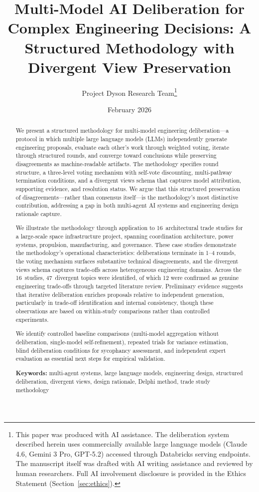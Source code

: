 \documentclass[11pt,a4paper]{article}
\title{\textbf{Multi-Model AI Deliberation for Complex Engineering Decisions: A Structured Methodology with Divergent View Preservation}}
\author{Project Dyson Research Team\thanks{This paper was produced with AI assistance. The deliberation system described herein uses commercially available large language models (Claude 4.6, Gemini 3 Pro, GPT-5.2) accessed through Databricks serving endpoints. The manuscript itself was drafted with AI writing assistance and reviewed by human researchers. Full AI involvement disclosure is provided in the Ethics Statement (Section~\ref{sec:ethics}).}}
\affil{Project Dyson --- Open-Source Space Infrastructure Initiative\\ \texttt{https://projectdyson.org}}
\date{February 2026}
\begin{document}
\maketitle

\begin{abstract}
We present a structured methodology for multi-model engineering deliberation---a protocol in which multiple large language models (LLMs) independently generate engineering proposals, evaluate each other's work through weighted voting, iterate through structured rounds, and converge toward conclusions while preserving disagreements as machine-readable artifacts. The methodology specifies round structure, a three-level voting mechanism with self-vote discounting, multi-pathway termination conditions, and a divergent views schema that captures model attribution, supporting evidence, and resolution status. We argue that this structured preservation of disagreements---rather than consensus itself---is the methodology's most distinctive contribution, addressing a gap in both multi-agent AI systems and engineering design rationale capture.

We illustrate the methodology through application to 16~architectural trade studies for a large-scale space infrastructure project, spanning coordination architecture, power systems, propulsion, manufacturing, and governance. These case studies demonstrate the methodology's operational characteristics: deliberations terminate in 1--4 rounds, the voting mechanism surfaces substantive technical disagreements, and the divergent views schema captures trade-offs across heterogeneous engineering domains. Across the 16~studies, 47~divergent topics were identified, of which 12 were confirmed as genuine engineering trade-offs through targeted literature review. Preliminary evidence suggests that iterative deliberation enriches proposals relative to independent generation, particularly in trade-off identification and internal consistency, though these observations are based on within-study comparisons rather than controlled experiments.

We identify controlled baseline comparisons (multi-model aggregation without deliberation, single-model self-refinement), repeated trials for variance estimation, blind deliberation conditions for sycophancy assessment, and independent expert evaluation as essential next steps for empirical validation.

\medskip
\noindent\textbf{Keywords:} multi-agent systems, large language models, engineering design, structured deliberation, divergent views, design rationale, Delphi method, trade study methodology
\end{abstract}
\end{document}
